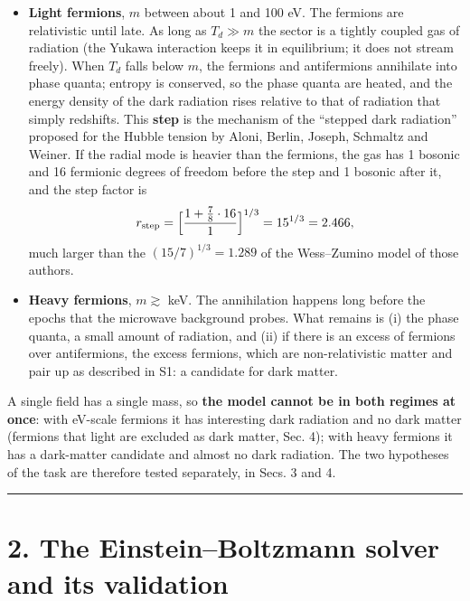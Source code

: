 \documentclass[
  10pt,
]{article}
\providecommand{\tightlist}{%
  \setlength{\itemsep}{0pt}\setlength{\parskip}{0pt}}
\begin{document}
\begin{itemize}
\tightlist
\item
  \textbf{Light fermions}, \(m\) between about 1 and 100 eV. The
  fermions are relativistic until late. As long as \(T_d\gg m\) the
  sector is a tightly coupled gas of radiation (the Yukawa interaction
  keeps it in equilibrium; it does not stream freely). When \(T_d\)
  falls below \(m\), the fermions and antifermions annihilate into phase
  quanta; entropy is conserved, so the phase quanta are heated, and the
  energy density of the dark radiation rises relative to that of
  radiation that simply redshifts. This \textbf{step} is the mechanism
  of the ``stepped dark radiation'' proposed for the Hubble tension by
  Aloni, Berlin, Joseph, Schmaltz and Weiner. If the radial mode is
  heavier than the fermions, the gas has 1 bosonic and 16 fermionic
  degrees of freedom before the step and 1 bosonic after it, and the
  step factor is
  \[r_{\rm step}=\Big[\frac{1+\tfrac78\cdot16}{1}\Big]^{1/3}=15^{1/3}=2.466,\]
  much larger than the \((15/7)^{1/3}=1.289\) of the Wess--Zumino model
  of those authors.
\item
  \textbf{Heavy fermions}, \(m\gtrsim\) keV. The annihilation happens
  long before the epochs that the microwave background probes. What
  remains is (i) the phase quanta, a small amount of radiation, and (ii)
  if there is an excess of fermions over antifermions, the excess
  fermions, which are non-relativistic matter and pair up as described
  in S1: a candidate for dark matter.
\end{itemize}

A single field has a single mass, so \textbf{the model cannot be in both
regimes at once}: with eV-scale fermions it has interesting dark
radiation and no dark matter (fermions that light are excluded as dark
matter, Sec. 4); with heavy fermions it has a dark-matter candidate and
almost no dark radiation. The two hypotheses of the task are therefore
tested separately, in Secs. 3 and 4.

\begin{center}\rule{0.5\linewidth}{0.5pt}\end{center}

\hypertarget{the-einsteinboltzmann-solver-and-its-validation}{%
\section{2. The Einstein--Boltzmann solver and its
validation}\label{the-einsteinboltzmann-solver-and-its-validation}}
\end{document}
